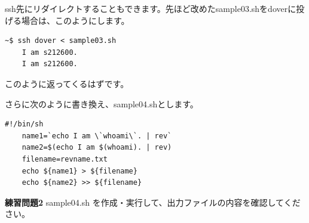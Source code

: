 \documentclass[a4j]{ltjsreport}
\begin{document}
    ssh先にリダイレクトすることもできます。先ほど改めたsample03.shをdoverに投げる場合は、このようにします。
    \begin{lstlisting}[numbers=none]
    ~$ ssh dover < sample03.sh
    I am s212600.
    I am s212600.
    \end{lstlisting}
    このように返ってくるはずです。



    さらに次のように書き換え、sample04.shとします。
    \begin{lstlisting}[caption=sample04.sh]
    #!/bin/sh
    name1=`echo I am \`whoami\`. | rev`
    name2=$(echo I am $(whoami). | rev)
    filename=revname.txt
    echo ${name1} > ${filename}
    echo ${name2} >> ${filename}
    \end{lstlisting}



    \begin{itembox}[l]{\textbf{練習問題2}}
        sample04.sh を作成・実行して、出力ファイルの内容を確認してください。
    \end{itembox}

\end{document}
